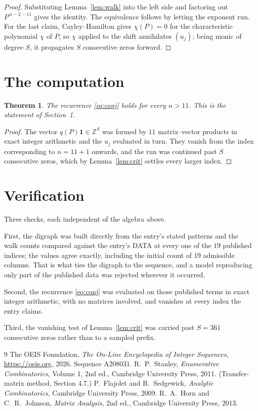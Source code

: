 \documentclass[11pt,a4paper]{article}
\theoremstyle{plain}
\newtheorem{theorem}{Theorem}
\theoremstyle{definition}
\begin{document}
\begin{proof}
Substituting Lemma~\ref{lem:walk} into the left side and factoring out
$P^{\,n-2-11}$ gives the identity. The equivalence follows by letting the exponent
run. For the last claim, Cayley--Hamilton gives $\chi(P)=0$ for the characteristic
polynomial $\chi$ of $P$, so $\chi$ applied to the shift annihilates $(u_j)$; being monic of
degree $S$, it propagates $S$ consecutive zeros forward.
\end{proof}

\section{The computation}

\begin{theorem}
The recurrence \eqref{eq:conj} holds for every $n>11$. This is the statement of
Section~1.
\end{theorem}

\begin{proof}
The vector $q(P)\mathbf{1}\in\mathbb{Z}^{S}$ was formed by $11$ matrix--vector
products in exact integer arithmetic and the $u_j$ evaluated in turn. They vanish from the
index corresponding to $n=11+1$ onwards, and the run was continued past $S$ consecutive
zeros, which by Lemma~\ref{lem:crit} settles every larger index.
\end{proof}

\section{Verification}

Three checks, each independent of the algebra above.

First, the digraph was built directly from the entry's stated patterns and the walk counts
compared against the entry's DATA at every one of the $19$ published indices; the
values agree exactly, including the initial count of $19$ admissible columns. That is
what ties the digraph to the sequence, and a model reproducing only part of the published
data was rejected wherever it occurred.

Second, the recurrence \eqref{eq:conj} was evaluated on those published terms in exact
integer arithmetic, with no matrices involved, and vanishes at every index the entry claims.

Third, the vanishing test of Lemma~\ref{lem:crit} was carried past $S=361$ consecutive
zeros rather than to a sampled prefix.

\begin{thebibliography}{9}
 The OEIS Foundation, \emph{The On-Line Encyclopedia of Integer
Sequences}, \url{https://oeis.org}, 2026. Sequence A208031.
 R.~P.~Stanley, \emph{Enumerative Combinatorics}, Volume 1, 2nd ed.,
Cambridge University Press, 2011. (Transfer-matrix method, Section 4.7.)
 P.~Flajolet and R.~Sedgewick, \emph{Analytic Combinatorics}, Cambridge
University Press, 2009.
 R.~A.~Horn and C.~R.~Johnson, \emph{Matrix Analysis}, 2nd ed., Cambridge
University Press, 2013.
\end{thebibliography}
\end{document}
